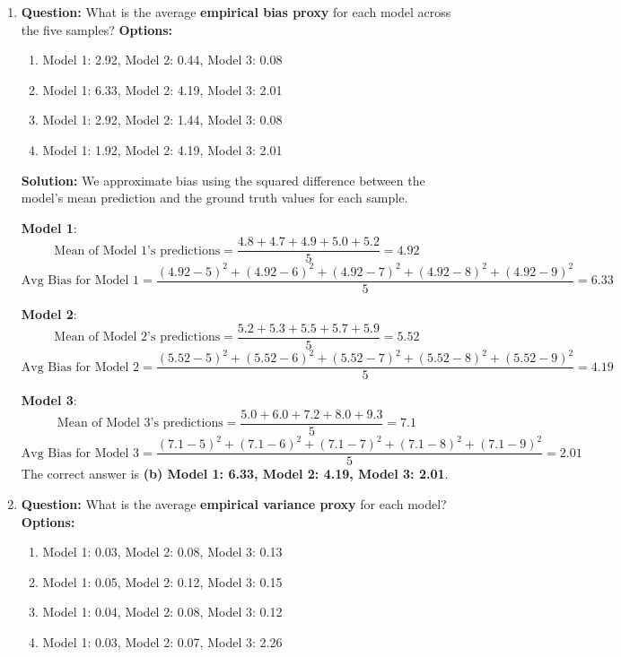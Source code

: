 \documentclass{article}
\begin{document}
\begin{enumerate}
    \item \textbf{Question:} \newline
    What is the average \textbf{empirical bias proxy} for each model across the five samples?
    \newline \newline
    \textbf{Options:}
    \begin{enumerate}
        \item Model 1: 2.92, Model 2: 0.44, Model 3: 0.08
        \item Model 1: 6.33, Model 2: 4.19, Model 3: 2.01
        \item Model 1: 2.92, Model 2: 1.44, Model 3: 0.08
        \item Model 1: 1.92, Model 2: 4.19, Model 3: 2.01
    \end{enumerate}
    
    \textbf{Solution:} \newline
    We approximate bias using the squared difference between the model’s mean prediction and the ground truth values for each sample.
    \newline
    
    \textbf{Model 1}:
    \[
    \text{Mean of Model 1's predictions} = \frac{4.8 + 4.7 + 4.9 + 5.0 + 5.2}{5} = 4.92
    \]
    \[
    \text{Avg Bias for Model 1} = \frac{(4.92 - 5)^2 + (4.92 - 6)^2 + (4.92 - 7)^2 + (4.92 - 8)^2 + (4.92 - 9)^2}{5} = 6.33
    \]

    \textbf{Model 2}:
    \[
    \text{Mean of Model 2's predictions} = \frac{5.2 + 5.3 + 5.5 + 5.7 + 5.9}{5} = 5.52
    \]
    \[
    \text{Avg Bias for Model 2} = \frac{(5.52 - 5)^2 + (5.52 - 6)^2 + (5.52 - 7)^2 + (5.52 - 8)^2 + (5.52 - 9)^2}{5} = 4.19
    \]

    \textbf{Model 3}:
    \[
    \text{Mean of Model 3's predictions} = \frac{5.0 + 6.0 + 7.2 + 8.0 + 9.3}{5} = 7.1
    \]
    \[
    \text{Avg Bias for Model 3} = \frac{(7.1 - 5)^2 + (7.1 - 6)^2 + (7.1 - 7)^2 + (7.1 - 8)^2 + (7.1 - 9)^2}{5} = 2.01
    \]
    The correct answer is \textbf{(b) Model 1: 6.33, Model 2: 4.19, Model 3: 2.01}.

    \item \textbf{Question:} \newline
    What is the average \textbf{empirical variance proxy} for each model?
    \newline \newline
    \textbf{Options:}
    \begin{enumerate}
        \item Model 1: 0.03, Model 2: 0.08, Model 3: 0.13
        \item Model 1: 0.05, Model 2: 0.12, Model 3: 0.15
        \item Model 1: 0.04, Model 2: 0.08, Model 3: 0.12
        \item Model 1: 0.03, Model 2: 0.07, Model 3: 2.26
    \end{enumerate}
    

\end{enumerate}
\end{document}
